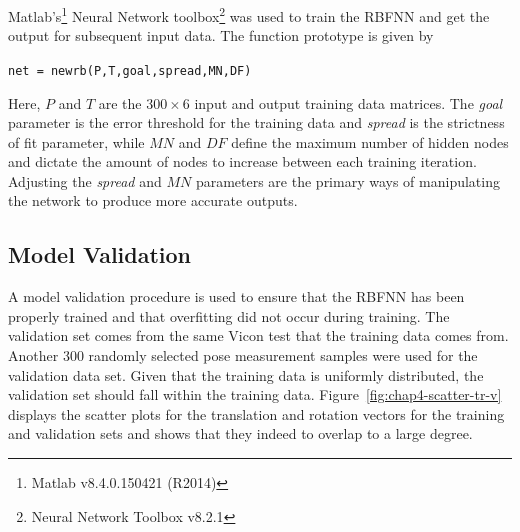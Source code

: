 Matlab's\footnote{Matlab v8.4.0.150421 (R2014)} Neural Network toolbox\footnote{Neural Network Toolbox v8.2.1} was used to train the RBFNN and get the output for subsequent input data. The function prototype is given by 

\begin{center}
  \verb|net = newrb(P,T,goal,spread,MN,DF)|
\end{center}

Here, $P$ and $T$ are the $300\times6$ input and output training data matrices. The \emph{goal} parameter is the error threshold for the training data and \emph{spread} is the strictness of fit parameter, while $\mathit{MN}$ and $\mathit{DF}$ define the maximum number of hidden nodes and dictate the amount of nodes to increase between each training iteration. Adjusting the \emph{spread} and $\mathit{MN}$ parameters are the primary ways of manipulating the network to produce more accurate outputs. 

\subsection{Model Validation}

A model validation procedure is used to ensure that the RBFNN has been properly trained and that overfitting did not occur during training. The validation set comes from the same Vicon test that the training data comes from. Another 300 randomly selected  pose measurement samples were used for the validation data set. Given that the training data is uniformly distributed, the validation set should fall within the training data. Figure~\ref{fig:chap4-scatter-tr-v} displays the scatter plots for the translation and rotation vectors for the training and validation sets and shows that they indeed to overlap to a large degree. 


